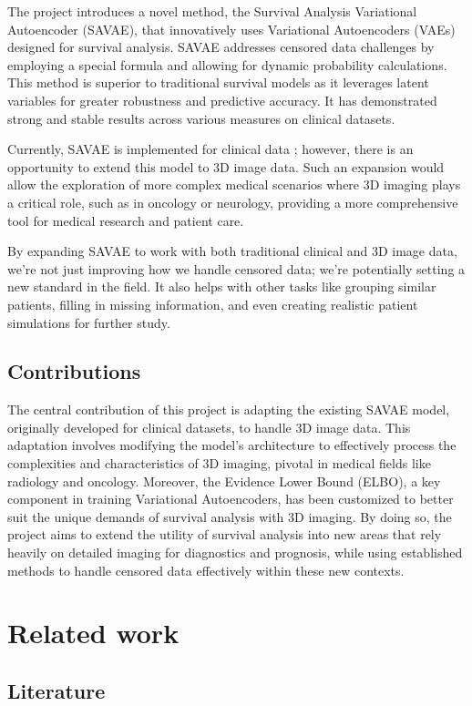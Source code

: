 \documentclass{article}
\begin{document}
The project introduces a novel method, the Survival Analysis Variational Autoencoder (SAVAE), that innovatively uses Variational Autoencoders (VAEs) designed for survival analysis. SAVAE addresses censored data challenges by employing a special formula and allowing for dynamic probability calculations. This method is superior to traditional survival models as it leverages latent variables for greater robustness and predictive accuracy. It has demonstrated strong and stable results across various measures on clinical datasets.

Currently, SAVAE is implemented for clinical data \cite{apellaniz2023savae}; however, there is an opportunity to extend this model to 3D image data. Such an expansion would allow the exploration of more complex medical scenarios where 3D imaging plays a critical role, such as in oncology or neurology, providing a more comprehensive tool for medical research and patient care.

By expanding SAVAE to work with both traditional clinical and 3D image data, we're not just improving how we handle censored data; we're potentially setting a new standard in the field. It also helps with other tasks like grouping similar patients, filling in missing information, and even creating realistic patient simulations for further study.


\subsection{Contributions}
The central contribution of this project is adapting the existing SAVAE model, originally developed for clinical datasets, to handle 3D image data. This adaptation involves modifying the model’s architecture to effectively process the complexities and characteristics of 3D imaging, pivotal in medical fields like radiology and oncology. Moreover, the Evidence Lower Bound (ELBO), a key component in training Variational Autoencoders, has been customized to better suit the unique demands of survival analysis with 3D imaging. By doing so, the project aims to extend the utility of survival analysis into new areas that rely heavily on detailed imaging for diagnostics and prognosis, while using established methods to handle censored data effectively within these new contexts.

\section{Related work}
\subsection{Literature}
\end{document}
